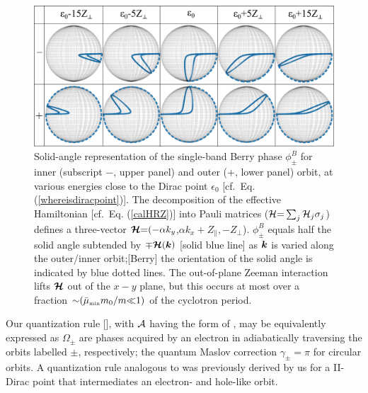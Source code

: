 \documentclass[aps, prb, showpacs, twocolumn, notitlepage, superscriptaddress]{revtex4-1}
\begin{document}
\begin{figure}
\includegraphics[width=1.0\columnwidth]{blochsphere.png}
\caption{Solid-angle representation of  the single-band Berry phase $\phi_{\pm}^B$ for inner (subscript $-$, upper panel) and outer ($+$, lower panel) orbit, at various energies close to the Dirac point $\epsilon_0$ [cf.\ Eq. (\ref{whereisdiracpoint})]. The decomposition of the effective Hamiltonian [cf.\ Eq. (\ref{calHRZ})] into  Pauli matrices (${\cal H}{=}\sum_j{\cal H}_j\sigma_j$) defines a three-vector $\boldsymbol{{\cal H}}{=}({-}\alpha k_y$,$\alpha k_x{+}Z_\parallel,{-}Z_\perp$). $\phi_{\pm}^B$ equals half the solid angle subtended by   ${\mp} \boldsymbol{{\cal H}}(\boldsymbol{k})$ [solid blue line] as $\boldsymbol{k}$ is varied along the outer/inner orbit;[Berry] the orientation of the solid angle is indicated by blue dotted lines. The out-of-plane Zeeman interaction lifts $\boldsymbol{{\cal H}}$ out of the $x-y$ plane, but this occurs at most over a fraction ${\sim}(\bar{\mu}_{\scriptscriptstyle{\text{min}}}m_0/m{\ll}1)$ of the cyclotron period. \label{fig:blochsphere}}
\end{figure}

Our quantization rule [], with ${\cal A}$ having the form of , may be equivalently expressed as
$\Omega_{\pm}$ are phases acquired by an electron in adiabatically traversing the orbits labelled $\pm$, respectively; the quantum Maslov correction $\gamma_{\pm}{=}\pi$ for circular orbits.  A quantization rule analogous to  was previously derived by us for a II-Dirac point that intermediates an electron- and hole-like orbit\cite{AALG}. 

\end{document}

